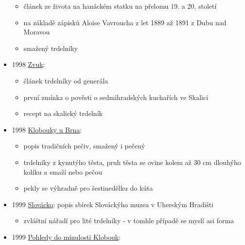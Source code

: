 \begin{itemize}
  \begin{itemize}
  \tightlist
  \item
    článek ze života na hanáckém statku na přelomu 19. a 20. století
  \item
    na základě zápisků Aloise Vavroucha z let 1889 až 1891 z Dubu nad
    Moravou
  \item
    smažený trdelníky
  \end{itemize}
\item
  1998
  \href{https://www.digitalniknihovna.cz/mzk/uuid/uuid:dd805301-5c91-11eb-94b4-5ef3fc9ae867}{Zvuk}:

  \begin{itemize}
  \tightlist
  \item
    článek trdelníky od generála
  \item
    první zmínka o pověsti o sedmihradských kuchařích ve Skalici
  \item
    recept na skalický trdelník
  \end{itemize}
\item
  1998
  \href{https://ceskadigitalniknihovna.cz/view/uuid:90c1d400-282b-11ed-9c80-005056827e51?page=uuid\%3Af40f9ec2-58d4-4e4a-b664-846a40f83308&source=nkp}{Klobouky
  u Brna}:

  \begin{itemize}
  \tightlist
  \item
    popis tradičních pečiv, smažený i pečený
  \item
    trdelníky z kynutýho těsta, pruh těsta se ovine kolem až 30 cm
    dlouhýho kolíku a smaží nebo pečou
  \item
    pekly se výhradně pro šestinedělku do kúta
  \end{itemize}
\item
  1999
  \href{https://ceskadigitalniknihovna.cz/view/uuid:57abf773-997c-406c-8ba1-063f2a52d0c4?page=uuid\%3A0ef9ff97-bf5a-11ed-9fa2-001b63bd97ba&fulltext=trdeln\%C3\%ADk\%20OR\%20trdeln\%C3\%ADky\%20OR\%20trdeln\%C3\%ADk\%C5\%AF&source=kfbz}{Slovácko}:
  popis sbírek Slováckýho muzea v Uherským Hradišti

  \begin{itemize}
  \tightlist
  \item
    zvláštní nářadí pro lité trdelníky - v tomhle případě se myslí asi
    forma
  \end{itemize}
\item
  1999
  \href{https://ceskadigitalniknihovna.cz/view/uuid:288aee50-92f1-11ec-a3e4-5ef3fc9bb22f?page=uuid\%3A82f08da1-51aa-455c-8d5d-cb64c45aa594&fulltext=trdeln\%C3\%ADk\%20OR\%20trdeln\%C3\%ADky\%20OR\%20trdeln\%C3\%ADk\%C5\%AF&source=nkp}{Pohledy
  do minulosti Klobouk}:


\end{itemize}
